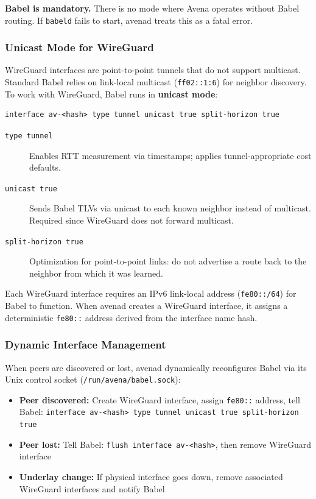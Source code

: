 \textbf{Babel is mandatory.} There is no mode where Avena operates without Babel routing. If \texttt{babeld} fails to start, avenad treats this as a fatal error.

\subsubsection{Unicast Mode for WireGuard}

WireGuard interfaces are point-to-point tunnels that do not support multicast. Standard Babel relies on link-local multicast (\texttt{ff02::1:6}) for neighbor discovery. To work with WireGuard, Babel runs in \textbf{unicast mode}:

\begin{lstlisting}
interface av-<hash> type tunnel unicast true split-horizon true
\end{lstlisting}

\begin{description}
    \item[\texttt{type tunnel}] Enables RTT measurement via timestamps; applies tunnel-appropriate cost defaults.
    \item[\texttt{unicast true}] Sends Babel TLVs via unicast to each known neighbor instead of multicast. Required since WireGuard does not forward multicast.
    \item[\texttt{split-horizon true}] Optimization for point-to-point links: do not advertise a route back to the neighbor from which it was learned.
\end{description}

Each WireGuard interface requires an IPv6 link-local address (\texttt{fe80::/64}) for Babel to function. When avenad creates a WireGuard interface, it assigns a deterministic \texttt{fe80::} address derived from the interface name hash.

\subsubsection{Dynamic Interface Management}

When peers are discovered or lost, avenad dynamically reconfigures Babel via its Unix control socket (\texttt{/run/avena/babel.sock}):

\begin{itemize}[nosep]
    \item \textbf{Peer discovered:} Create WireGuard interface, assign \texttt{fe80::} address, tell Babel: \texttt{interface av-<hash> type tunnel unicast true split-horizon true}
    \item \textbf{Peer lost:} Tell Babel: \texttt{flush interface av-<hash>}, then remove WireGuard interface
    \item \textbf{Underlay change:} If physical interface goes down, remove associated WireGuard interfaces and notify Babel
\end{itemize}

